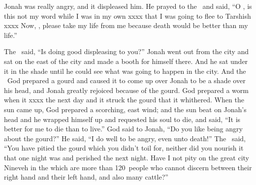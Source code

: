 
\begin{inparaenum}
   Jonah was really angry, and it displeased him.%
   He prayed to the \lord\ and said, ``O \lord, is this not my word while I was in my own xxxx that I was going to flee to Tarshish xxxx%
   Now, \lord, please take my life from me because death would be better than my life.''%
  
   The \lord\ said, ``Is doing good displeasing to you?''%
   Jonah went out from the city and sat on the east of the city and made a booth for himself there. And he sat under it in the shade until he could see what was going to happen in the city.%
   And the \lord\ God prepared a gourd and caused it to come up over Jonah to be a shade over his head, and Jonah greatly rejoiced because of the gourd.%
   God prepared a worm when it xxxx the next day and it struck the gourd that it whithered.%
   When the sun came up, God prepared a scorching, east wind; and the sun beat on Jonah's head and he wrapped himself up and requested his soul to die, and said, ``It is better for me to die than to live.''%
   God said to Jonah, ``Do you like being angry about the gourd?'' He said, ``I do well to be angry, even unto death!''%
   The \lord\ said, ``You have pitied the gourd which you didn't toil for, neither did you nourish it that one night was and perished the next night.%
   Have I not pity on the great city Nineveh in the which are more than 120~people who cannot discern between their right hand and their left hand, and also many cattle?''%
\end{inparaenum}
